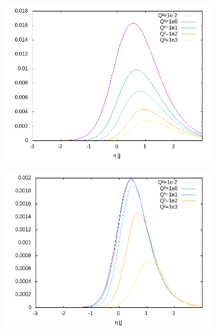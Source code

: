 \begin{figure}[ht!]
\centering
\begin{subfigure}[t]{.3\textwidth}
	\includegraphics[width=\textwidth]{../../img2/partonic/dq1_VV_F2}
\end{subfigure}%
\begin{subfigure}[t]{.3\textwidth}
	\includegraphics[width=\textwidth]{../../img2/partonic/dq1_VV_FL}
\end{subfigure}%
\begin{subfigure}[t]{.3\textwidth}

\end{subfigure}
\end{figure}
